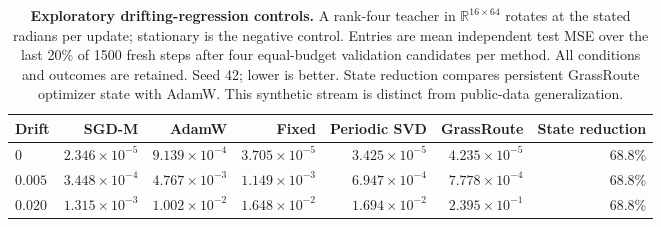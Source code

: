 \begin{table}[t]\centering\footnotesize
\caption{\textbf{Exploratory drifting-regression controls.} A rank-four
teacher in $\mathbb{R}^{16\times64}$ rotates at the stated radians per
update; stationary is the negative control. Entries are mean independent
test MSE over the last 20\% of 1500 fresh steps after four equal-budget
validation candidates per method. All conditions and outcomes are retained.
Seed 42; lower is better. State reduction compares persistent GrassRoute
optimizer state with AdamW. This synthetic stream is distinct from
public-data generalization.}
\label{tab:focused-regression}
\setlength{\tabcolsep}{6pt}
\begin{tabular}{lrrrrrr}\toprule
Drift & SGD-M & AdamW & Fixed & Periodic SVD & GrassRoute & State reduction \\ \midrule
$0$ & $2.346\times10^{-5}$ & $9.139\times10^{-4}$ & $3.705\times10^{-5}$ & $3.425\times10^{-5}$ & \cellcolor{oursbg}$4.235\times10^{-5}$ & 68.8\% \\
$0.005$ & $3.448\times10^{-4}$ & $4.767\times10^{-3}$ & $1.149\times10^{-3}$ & $6.947\times10^{-4}$ & \cellcolor{oursbg}$7.778\times10^{-4}$ & 68.8\% \\
$0.020$ & $1.315\times10^{-3}$ & $1.002\times10^{-2}$ & $1.648\times10^{-2}$ & $1.694\times10^{-2}$ & \cellcolor{oursbg}$2.395\times10^{-1}$ & 68.8\% \\
\bottomrule\end{tabular}\end{table}
